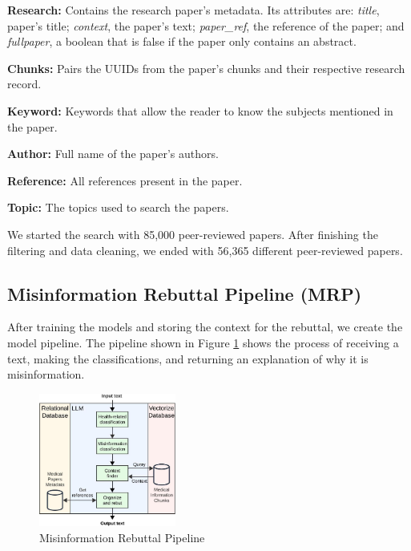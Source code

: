 \begin{description}
	\item{\textbf{Research:}}  Contains the research paper's metadata. Its attributes are: \textit{title}, paper's title; \textit{context}, the paper’s text; \textit{paper\_ref}, the reference of the paper; and \textit{fullpaper}, a boolean that is false if the paper only contains an abstract.
	\item{\textbf{Chunks:}} Pairs the UUIDs from the paper's chunks and their respective research record.  
	\item{\textbf{Keyword:}} Keywords that allow the reader to know the subjects mentioned in the paper. 
	\item{\textbf{Author:}} Full name of the paper's authors. 
	\item{\textbf{Reference:}} All references present in the paper.
	\item{\textbf{Topic:}} The topics used to search the papers.

\end{description}



We started the search with 85,000 peer-reviewed papers. After finishing the filtering and data cleaning, we ended with 56,365 different peer-reviewed papers. 


\subsection{Misinformation Rebuttal Pipeline (MRP)}
After training the models and storing the context for the rebuttal, we create the model pipeline. The pipeline shown in Figure \ref{fig:llm} shows the process of receiving a text, making the classifications, and returning an explanation of why it is misinformation.

\begin{figure}[htbp]
	\begin{center}
		\includegraphics[width=0.4\textwidth]{figures/LLM_Pipeline.jpeg} %
	\end{center}
	\caption{Misinformation Rebuttal Pipeline} %
	\label{fig:llm}
\end{figure}


